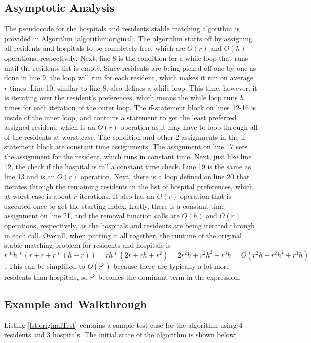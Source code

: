 \documentclass[letterpaper, 10pt,DIV=13]{scrartcl}
\numberwithin{equation}{section} %
\numberwithin{figure}{section} %
\numberwithin{table}{section} %
\begin{document}
\subsection{Asymptotic Analysis}
The pseudocode for the hospitals and residents stable matching algorithm is provided in Algorithm \ref{algorithm:original}. The algorithm starts off by assigning all residents and hospitals to be completely free, which are $O(r)$ and $O(h)$ operations, respectively. Next, line 8 is the condition for a while loop that runs until the residents list is empty. Since residents are being picked off one-by-one as done in line 9, the loop will run for each resident, which makes it run on average $r$ times. Line 10, similar to line 8, also defines a while loop. This time, however, it is iterating over the resident's preferences, which means the while loop runs $h$ times for each iteration of the outer loop. The if-statement block on lines 12-16 is inside of the inner loop, and contains a statement to get the least preferred assigned resident, which is an $O(r)$ operation as it may have to loop through all of the residents at worst case. The condition and other 2 assignments in the if-statement block are constant time assignments. The assignment on line 17 sets the assignment for the resident, which runs in constant time. Next, just like line 12, the check if the hospital is full a constant time check. Line 19 is the same as line 13 and is an $O(r)$ operation. Next, there is a loop defined on line 20 that iterates through the remaining residents in the list of hospital preferences, which at worst case is about $r$ iterations. It also has an $O(r)$ operation that is executed once to get the starting index. Lastly, there is a constant time assignment on line 21, and the removal function calls are $O(h)$ and $O(r)$ operations, respectively, as the hospitals and residents are being iterated through in each call. Overall, when putting it all together, the runtime of the original stable matching problem for residents and hospitals is $r * h * (r + r + r * (h + r)) = rh * (2r + rh + r^2) = 2r^2h + r^2h^2 + r^3h = O(r^2h + r^2h^2 + r^3h)$. This can be simplified to $O(r^3)$ because there are typically a lot more residents than hospitals, so $r^3$ becomes the dominant term in the expression.

\subsection{Example and Walkthrough}
Listing \ref{lst:originalTest} contains a sample test case for the algorithm using 4 residents and 3 hospitals. The initial state of the algorithm is shown below:
\end{document}
